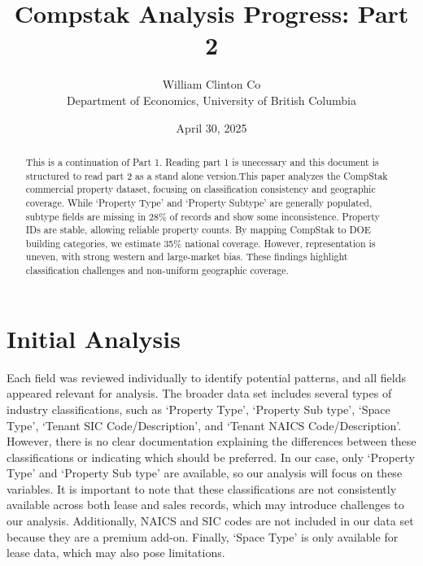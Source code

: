 \documentclass[
  12pt]{article}
\begin{document}
\def\spacingset#1{\renewcommand{\baselinestretch}%
{#1}\small\normalsize} \spacingset{1}



\date{April 30, 2025}
\title{\bf Compstak Analysis Progress: Part 2}
\author{
William Clinton Co\\
Department of Economics, University of British Columbia\\
}
\maketitle

\bigskip
\bigskip
\begin{abstract}
This is a continuation of Part 1. Reading part 1 is unecessary and this
document is structured to read part 2 as a stand alone version.This
paper analyzes the CompStak commercial property dataset, focusing on
classification consistency and geographic coverage. While `Property
Type' and `Property Subtype' are generally populated, subtype fields are
missing in 28\% of records and show some inconsistence. Property IDs are
stable, allowing reliable property counts. By mapping CompStak to DOE
building categories, we estimate 35\% national coverage. However,
representation is uneven, with strong western and large-market bias.
These findings highlight classification challenges and non-uniform
geographic coverage.
\end{abstract}


\newpage
\spacingset{1.9} %

\section{Initial Analysis}\label{sec-intro}

Each field was reviewed individually to identify potential patterns, and
all fields appeared relevant for analysis. The broader data set includes
several types of industry classifications, such as `Property Type',
`Property Sub type', `Space Type', `Tenant SIC Code/Description', and
`Tenant NAICS Code/Description'. However, there is no clear
documentation explaining the differences between these classifications
or indicating which should be preferred. In our case, only `Property
Type' and `Property Sub type' are available, so our analysis will focus
on these variables. It is important to note that these classifications
are not consistently available across both lease and sales records,
which may introduce challenges to our analysis. Additionally, NAICS and
SIC codes are not included in our data set because they are a premium
add-on. Finally, `Space Type' is only available for lease data, which
may also pose limitations.
\end{document}
